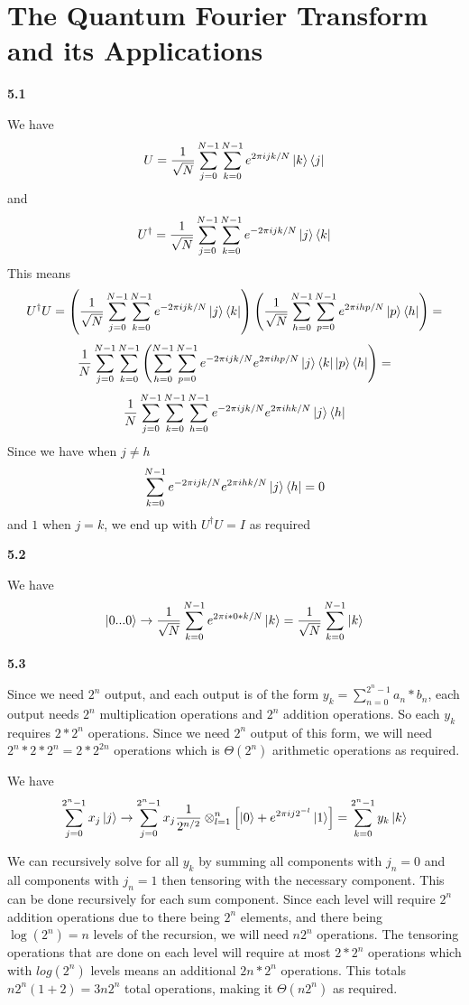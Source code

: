 \section{The Quantum Fourier Transform and its Applications}

\textbf{5.1}

We have \[U = \frac{1}{\sqrt{N}}\sum_{j=0}^{N-1}\sum_{k=0}^{N-1}e^{2\pi i jk/N}\ket{k}\bra{j}\] and
\[U^\dag = \frac{1}{\sqrt{N}}\sum_{j=0}^{N-1}\sum_{k=0}^{N-1}e^{-2\pi i jk/N}\ket{j}\bra{k}\]
This means 
\[U^\dag U = \left(\frac{1}{\sqrt{N}}\sum_{j=0}^{N-1}\sum_{k=0}^{N-1}e^{-2\pi i jk/N}\ket{j}\bra{k}\right)\left(\frac{1}{\sqrt{N}}\sum_{h=0}^{N-1}\sum_{p=0}^{N-1}e^{2\pi i hp/N}\ket{p}\bra{h}\right) = \]
\[\frac{1}{N}\sum_{j=0}^{N-1}\sum_{k=0}^{N-1}\left(\sum_{h=0}^{N-1}\sum_{p=0}^{N-1}e^{-2\pi i jk/N}e^{2\pi i hp/N}\ket{j}\bra{k}\ket{p}\bra{h}\right) = \]
\[\frac{1}{N}\sum_{j=0}^{N-1}\sum_{k=0}^{N-1}\sum_{h=0}^{N-1}e^{-2\pi i jk/N}e^{2\pi i hk/N}\ket{j}\bra{h} \]
Since we have when $j\neq h$ \[\sum_{k = 0}^{N-1}e^{-2\pi i jk/N}e^{2\pi i hk/N}\ket{j}\bra{h} = 0\] and $1$ when $j=k$, we end up with $U^\dag U = I$ as required

\textbf{5.2}

We have \[\ket{0...0} \rightarrow \frac{1}{\sqrt{N}}\sum_{k=0}^{N-1}e^{2\pi i *0*k/N}\ket{k} = \frac{1}{\sqrt{N}}\sum_{k=0}^{N-1}\ket{k}\]

\textbf{5.3}

Since we need $2^n$ output, and each output is of the form $ y_k = \sum_{n=0}^{2^n-1}a_n*b_n$, each output needs $2^n$ multiplication operations and $2^n$ addition operations. So each $y_k$ requires $2*2^n$ operations. Since we need $2^n $ output of this form, we will need $2^n*2*2^n = 2*2^{2n}$ operations which is $\Theta(2^n)$ arithmetic operations as required.

We have 
\[\sum_{j=0}^{2^n-1}x_j\ket{j} \rightarrow \sum_{j=0}^{2^n-1}x_j\frac{1}{2^{n/2}}\otimes_{l=1}^n\left[\ket{0}  + e^{2\pi i j2^{-l}}\ket{1}\right] = \sum_{k=0}^{2^n-1}y_k\ket{k}\]

We can recursively solve for all $y_k$ by summing all components with $j_n = 0 $ and all components with $j_n = 1$ then tensoring with the necessary component. This can be done recursively for each sum component. Since each level will require $2^n$ addition operations due to there being $2^n$ elements, and there being $\log(2^n) = n$ levels of the recursion, we will need $n2^n$ operations. The tensoring operations that are done on each level will require at most $2*2^n$ operations which with $log(2^n)$ levels means an additional $2n*2^n$ operations. This totals $n2^n(1+2) = 3n2^n$ total operations, making it $\Theta(n2^n)$ as required.

